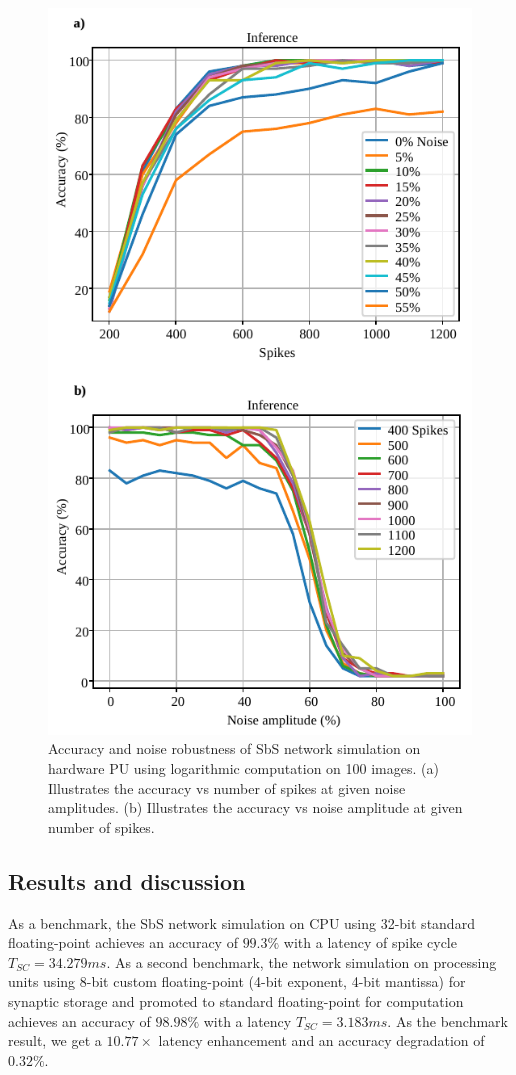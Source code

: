 \begin{figure}[h!]
	\centering
	\includegraphics[width=1\columnwidth]{../figures/accuracy_vs_noise_pu_log.pdf}
	\caption{Accuracy and noise robustness of SbS network simulation on hardware PU using logarithmic computation on 100 images. (a) Illustrates the accuracy vs number of spikes at given noise amplitudes. (b) Illustrates the accuracy vs noise amplitude at given number of spikes.}
	\label{fig:accuracy_vs_noise_pu_log}
\end{figure}


\subsection{Results and discussion}
As a benchmark, the SbS network simulation on CPU using 32-bit standard floating-point achieves an accuracy of $99.3\%$ with a latency of spike cycle $T_{SC} = 34.279ms$. As a second benchmark, the network simulation on processing units using 8-bit custom floating-point (4-bit exponent, 4-bit mantissa) for synaptic storage and promoted to standard floating-point for computation achieves an accuracy of $98.98\%$ with a latency $T_{SC}=3.183ms$. As the benchmark result, we get a $10.77\times$ latency enhancement and an accuracy degradation of $0.32\%$.


